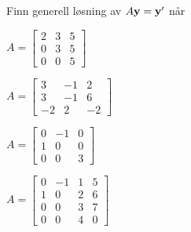 \begin{oppgave}
Finn generell løsning av $A\mathbf{y}=\mathbf{y}'$ når
\begin{punkt}
$
A=
\begin{bmatrix}
2 & 3 & 5\\
0 & 3 & 5\\
0 & 0 & 5
\end{bmatrix}
$ 
\end{punkt}
%
\begin{punkt}
$
A=
\begin{bmatrix}
3 & -1 & 2\\
3 & -1 & 6\\
-2 & 2 & -2
\end{bmatrix}$
\end{punkt}

\begin{punkt}
$
A=
\begin{bmatrix}
0 & -1 & 0\\
1 & 0 & 0\\
0 & 0 & 3
\end{bmatrix}$
\end{punkt}



\begin{punkt}
$
A=
\begin{bmatrix}
0 & -1 & 1& 5\\
1 & 0 & 2& 6\\
0 & 0 & 3 & 7\\
0 & 0 & 4 & 0
\end{bmatrix}$
\end{punkt}


\end{oppgave}

